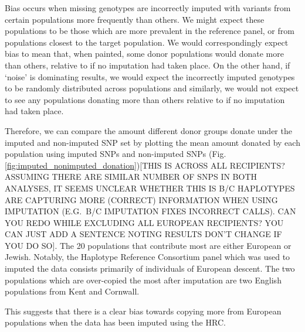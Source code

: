 Bias occurs when missing genotypes are incorrectly imputed with variants from certain populations more frequently than others. We might expect these populations to be those which are more prevalent in the reference panel, or from populations closest to the target population. We would correspondingly expect bias to mean that, when painted, some donor populations would donate more than others, relative to if no imputation had taken place. On the other hand, if `noise' is dominating results, we would expect the incorrectly imputed genotypes to be randomly distributed across populations and similarly, we would not expect to see any populations donating more than others relative to if no imputation had taken place. 

Therefore, we can compare the amount different donor groups donate under the imputed and non-imputed SNP set by plotting the mean amount donated by each population using imputed SNPs and non-imputed SNPs (Fig. \ref{fig:imputed_nonimputed_donation}){\color{red}[THIS IS ACROSS ALL RECIPIENTS? ASSUMING THERE ARE SIMILAR NUMBER OF SNPS IN BOTH ANALYSES, IT SEEMS UNCLEAR WHETHER THIS IS B/C HAPLOTYPES ARE CAPTURING MORE (CORRECT) INFORMATION WHEN USING IMPUTATION (E.G.\ B/C IMPUTATION FIXES INCORRECT CALLS). CAN YOU REDO WHILE EXCLUDING ALL EUROPEAN RECIPIENTS? YOU CAN JUST ADD A SENTENCE NOTING RESULTS DON'T CHANGE IF YOU DO SO]}. The 20 populations that contribute most are either European or Jewish. Notably, the Haplotype Reference Consortium panel which was used to imputed the data consists primarily of individuals of European descent. The two populations which are over-copied the most after imputation are two English populations from Kent and Cornwall. 

This suggests that there is a clear bias towards copying more from European populations when the data has been imputed using the HRC. 


